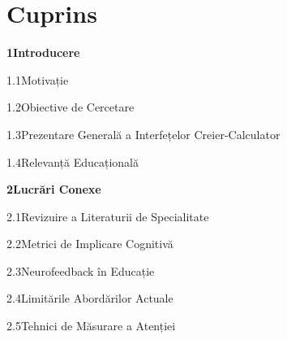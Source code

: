 \newpage
\chapter*{Cuprins}

{\large\noindent\textbf{1\quad Introducere}\dotfill\textbf{\pageref{cap:intro}}\par}
\vspace{2pt}
\noindent\hspace{1.5em}1.1\enspace Motivație\dotfill\pageref{sect:mot}\par
\noindent\hspace{1.5em}1.2\enspace Obiective de Cercetare\dotfill\pageref{sect:robj}\par
\noindent\hspace{1.5em}1.3\enspace Prezentare Generală a Interfețelor Creier-Calculator\dotfill\pageref{sect:bciov}\par
\noindent\hspace{1.5em}1.4\enspace Relevanță Educațională\dotfill\pageref{sect:edurel}\par
\bigskip

{\large\noindent\textbf{2\quad Lucrări Conexe}\dotfill\textbf{\pageref{cap:relwork}}\par}
\vspace{2pt}
\noindent\hspace{1.5em}2.1\enspace Revizuire a Literaturii de Specialitate\dotfill\pageref{sect:litrev}\par
\noindent\hspace{1.5em}2.2\enspace Metrici de Implicare Cognitivă\dotfill\pageref{sect:cognmet}\par
\noindent\hspace{1.5em}2.3\enspace Neurofeedback în Educație\dotfill\pageref{sect:neurfbedu}\par
\noindent\hspace{1.5em}2.4\enspace Limitările Abordărilor Actuale\dotfill\pageref{sect:limcurrapp}\par
\noindent\hspace{1.5em}2.5\enspace Tehnici de Măsurare a Atenției\dotfill\pageref{sect:attmeasteq}\par
\bigskip

